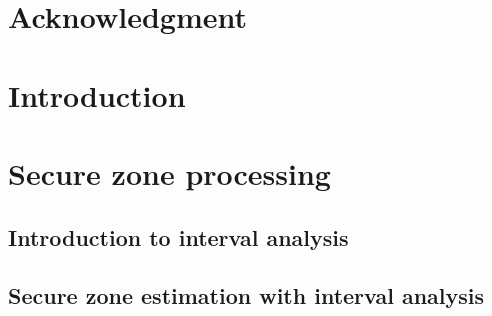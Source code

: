 \documentclass[12pt,fleqn]{report} %
\begin{document}
\renewcommand{\contentsname}{Contents}	%
\renewcommand{\bibname}{Bibliography}	%





\tableofcontents  %
\cleardoublepage  %


\chapter*{Acknowledgment}



\chapter{Introduction}



\chapter{Secure zone processing}

\section{Introduction to interval analysis}


\section{Secure zone estimation with interval analysis}

\end{document}
